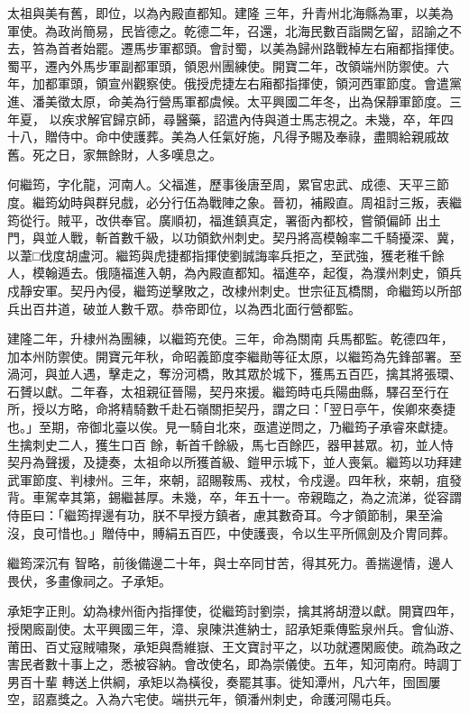 \begin{pinyinscope}
 太祖與美有舊，即位，以為內殿直都知。建隆
 三年，升青州北海縣為軍，以美為軍使。為政尚簡易，民皆德之。乾德二年，召還，北海民數百詣闕乞留，詔諭之不去，笞為首者始罷。遷馬步軍都頭。會討蜀，以美為歸州路戰棹左右廂都指揮使。蜀平，遷內外馬步軍副都軍頭，領恩州團練使。開寶二年，改領端州防禦使。六年，加都軍頭，領宣州觀察使。俄授虎捷左右廂都指揮使，領河西軍節度。會遣黨進、潘美徵太原，命美為行營馬軍都虞候。太平興國二年冬，出為保靜軍節度。三年夏，
 以疾求解官歸京師，尋醫藥，詔遣內侍與道士馬志視之。未幾，卒，年四十八，贈侍中。命中使護葬。美為人任氣好施，凡得予賜及奉祿，盡賙給親戚故舊。死之日，家無餘財，人多嘆息之。



 何繼筠，字化龍，河南人。父福進，歷事後唐至周，累官忠武、成德、天平三節度。繼筠幼時與群兒戲，必分行伍為戰陣之象。晉初，補殿直。周祖討三叛，表繼筠從行。賊平，改供奉官。廣順初，福進鎮真定，署衙內都校，嘗領偏師
 出土門，與並人戰，斬首數千級，以功領欽州刺史。契丹將高模翰率二千騎擾深、冀，以葦□伐度胡盧河。繼筠與虎捷都指揮使劉誠誨率兵拒之，至武強，獲老稚千餘人，模翰遁去。俄隨福進入朝，為內殿直都知。福進卒，起復，為濮州刺史，領兵戍靜安軍。契丹內侵，繼筠逆擊敗之，改棣州刺史。世宗征瓦橋關，命繼筠以所部兵出百井道，破並人數千眾。恭帝即位，以為西北面行營都監。



 建隆二年，升棣州為團練，以繼筠充使。三年，命為關南
 兵馬都監。乾德四年，加本州防禦使。開寶元年秋，命昭義節度李繼勛等征太原，以繼筠為先鋒部署。至渦河，與並人遇，擊走之，奪汾河橋，敗其眾於城下，獲馬五百匹，擒其將張環、石贇以獻。二年春，太祖親征晉陽，契丹來援。繼筠時屯兵陽曲縣，驛召至行在所，授以方略，命將精騎數千赴石嶺關拒契丹，謂之曰：「翌日亭午，俟卿來奏捷也。」至期，帝御北臺以俟。見一騎自北來，亟遣逆問之，乃繼筠子承睿來獻捷。生擒刺史二人，獲生口百
 餘，斬首千餘級，馬七百餘匹，器甲甚眾。初，並人恃契丹為聲援，及捷奏，太祖命以所獲首級、鎧甲示城下，並人喪氣。繼筠以功拜建武軍節度、判棣州。三年，來朝，詔賜鞍馬、戎杖，令戍邊。四年秋，來朝，疽發背。車駕幸其第，錫繼甚厚。未幾，卒，年五十一。帝親臨之，為之流涕，從容謂侍臣曰：「繼筠捍邊有功，朕不早授方鎮者，慮其數奇耳。今才領節制，果至淪沒，良可惜也。」贈侍中，賻絹五百匹，中使護喪，令以生平所佩劍及介冑同葬。



 繼筠深沉有
 智略，前後備邊二十年，與士卒同甘苦，得其死力。善揣邊情，邊人畏伏，多畫像祠之。子承矩。



 承矩字正則。幼為棣州衙內指揮使，從繼筠討劉崇，擒其將胡澄以獻。開寶四年，授閑廄副使。太平興國三年，漳、泉陳洪進納士，詔承矩乘傳監泉州兵。會仙游、莆田、百丈寇賊嘯聚，承矩與喬維嶽、王文寶討平之，以功就遷閑廄使。疏為政之害民者數十事上之，悉被容納。會改使名，即為崇儀使。五年，知河南府。時調丁男百十輩
 轉送上供綱，承矩以為橫役，奏罷其事。徙知潭州，凡六年，囹圄屢空，詔嘉獎之。入為六宅使。端拱元年，領潘州刺史，命護河陽屯兵。




\end{pinyinscope}
